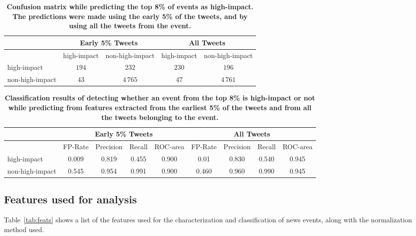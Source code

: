 \begin{table}
  \centering
  \begin{tabular}{lcc|cc}
    \toprule
    \multirow{2}{*}{ }& \multicolumn{2}{c}{Early 5\% Tweets} & \multicolumn{2}{c}{All Tweets} \\
    \midrule
    & high-impact & non-high-impact & high-impact & non-high-impact \\
    high-impact & $194$ & $232$ & $230$ & $196$\\
    non-high-impact & $43$ & $4\,765$ & $47$ & $4\,761$ \\
    \bottomrule
  \end{tabular}
  \caption{\textbf{Confusion matrix while predicting the top 8\% of events
      as high-impact.  The predictions were made using the early 5\% of the tweets, and by using
      all the tweets from the event.}}
  \label{tab:confusion_matrix}
\end{table}
\begin{table}

  \centering
  {\small
    \begin{tabular}{lcccc|cccc}
      \toprule
      & \multicolumn{4}{c}{Early 5\% Tweets} & \multicolumn{4}{c}{All Tweets} \\
      \midrule
      & FP-Rate & Precision & Recall & ROC-area & FP-Rate & Precision & Recall & ROC-area \\
      high-impact & 0.009 & 0.819 & 0.455 & 0.900 & 0.01 & 0.830 & 0.540 & 0.945 \\
      non-high-impact & 0.545 & 0.954 & 0.991 & 0.900 &  0.460 & 0.960 & 0.990 & 0.945 \\
      \bottomrule
    \end{tabular}
  }
  \caption{\textbf{Classification results of detecting whether an event from the top 8\% is high-impact or not
      while predicting from features extracted from the earliest 5\% of the tweets and from all the tweets belonging to the event.}}
  \label{tab:classification_results}
\end{table}

\subsection{Features used for analysis}

Table~\ref{tab:feats} shows a list of the features used for the
characterization and classification of news events, along with the
normalization method used.

